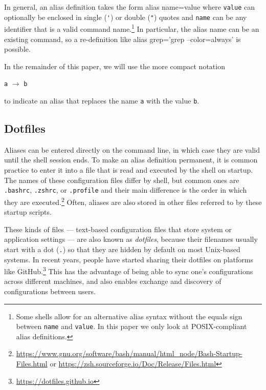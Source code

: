 \documentclass[smallextended,natbib]{svjour3}
\newenvironment{CVerbatim}
  {\center\BVerbatim}
  {\endBVerbatim\endcenter}
\newcommand{\alias}[2]{{\texttt{#1} $\rightarrow$ \texttt{#2}}}
\begin{document}


In general, an alias definition takes the form
\begin{CVerbatim}
alias name=value
\end{CVerbatim}
where \verb|value| can optionally be enclosed in single (\verb|'|) or double (\verb|"|) quotes and \verb|name| can be any identifier that is a valid command name.\footnote{Some shells allow for an alternative alias syntax without the equals sign between \texttt{name} and \texttt{value}. In this paper we only look at POSIX-compliant alias definitions.}
In particular, the alias name can be an existing command, so a re-definition like
\begin{CVerbatim}
alias grep='grep --color=always'
\end{CVerbatim}
is possible.

In the remainder of this paper, we will use the more compact notation
\begin{center}\alias{a}{b}\end{center} to indicate an alias that replaces the name \texttt{a} with the value \texttt{b}.

\subsection{Dotfiles}

Aliases can be entered directly on the command line, in which case they are valid until the shell session ends.
To make an alias definition permanent, it is common practice to enter it into a file that is read and executed by the shell on startup.
The names of these configuration files differ by shell, but common ones are \verb|.bashrc|, \verb|.zshrc|, or \verb|.profile| and their main difference is the order in which they are executed.\footnote{\url{https://www.gnu.org/software/bash/manual/html_node/Bash-Startup-Files.html} or \url{https://zsh.sourceforge.io/Doc/Release/Files.html}}
Often, aliases are also stored in other files referred to by these startup scripts.

These kinds of files --- text-based configuration files that store system or application settings --- are also known as \emph{dotfiles}, because their filenames usually start with a dot (\verb|.|) so that they are hidden by default on most Unix-based systems.
In recent years, people have started sharing their dotfiles on platforms like GitHub.\footnote{\url{https://dotfiles.github.io}}
This has the advantage of being able to sync one's configurations across different machines, and also enables exchange and discovery of configurations between users.
\end{document}
